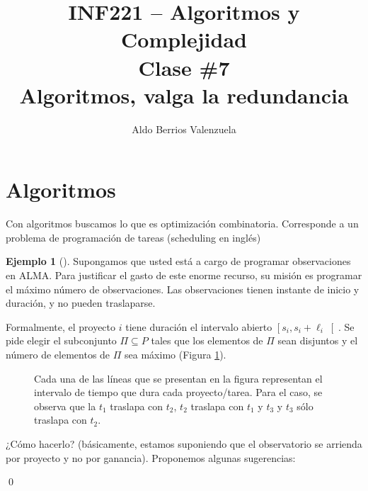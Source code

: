 \documentclass[english, spanish, fleqn, 10pt]{article}
\author{Aldo Berrios Valenzuela}
\title{INF221 -- Algoritmos y Complejidad\\[.4\baselineskip]Clase \#7\\Algoritmos, valga la redundancia}
\numberwithin{equation}{section}
\theoremstyle{definition}
\newtheorem{beforeExample}{Ejemplo}[section]
\newenvironment{ejemplo}[1][]{\begin{beforeExample}[#1]\renewcommand{\qedsymbol}{$\blacksquare$}}{\qed\end{beforeExample}}
\begin{document}
\maketitle
\section{Algoritmos}
Con algoritmos buscamos lo que es optimización combinatoria. Corresponde a un problema de programación de tareas (scheduling en inglés)

\begin{ejemplo}\label{07::EjemploAlma}
	Supongamos que usted está a cargo de programar observaciones en ALMA. Para justificar el gasto de este enorme recurso, su misión es programar el máximo número de observaciones. Las observaciones tienen instante de inicio y duración, y no pueden traslaparse.
	
	Formalmente, el proyecto $i$ tiene duración el intervalo abierto $\left[ s_i, s_i+\ell _i \right[$. Se pide elegir el subconjunto $\Pi\subseteq P$ tales que los elementos de $\Pi$ sean disjuntos y el número de elementos de $\Pi$ sea máximo (Figura \ref{07::Tareas1}). 
	\begin{figure}[!h]
		\centering
		\newcommand{\lineaTarea}[3]{\draw (#1, 0.15+#2) -- (#1, -0.15+#2) -- (#1, #2) -- (#1+#3, #2) -- (#1+#3, 0.15+#2) -- (#1+#3, -0.15+#2)} %
		\caption{Cada una de las líneas que se presentan en la figura representan el intervalo de tiempo que dura cada proyecto/tarea. Para el caso, se observa que la $t_1$ traslapa con $t_2$, $t_2$ traslapa con $t_1$ y $t_3$ y $t_3$ sólo traslapa con $t_2$.}
		\label{07::Tareas1}
	\end{figure}
	¿Cómo hacerlo? (básicamente, estamos suponiendo que el observatorio se arrienda por proyecto y no por ganancia). Proponemos algunas sugerencias:
	

\end{ejemplo}
\end{document}
